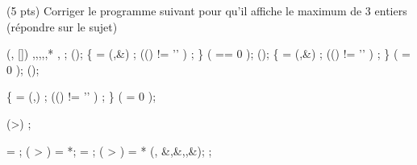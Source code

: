 
\question (5 pts) Corriger le programme suivant pour qu'il affiche le maximum
  de 3 entiers (r{\'e}pondre sur le sujet)

\begin{Ccode}
\ctab{} 
\ctab{}\cint {} (\cint {}, \cchar *[])\lb
\ctab{}  \cint {},,,,,*
,
\ctab{}  \cint {};
\ctab{}   
\ctab{}  ();
\ctab{}  \cdo \{  = (,\&) ; 
\cwhile (() != '\n' ) ; \} \cwhile (  == 0 );    
\ctab{}  ();
\ctab{}  \cdo \{  = (,\&) ; 
\cwhile (() != '\n' ) ; \} \cwhile (  = 0 );
\ctab{}  ();     
   
\ctab{}  \cdo \{  = (,) ; 
\cwhile (() != '\n' ) ; \} \cwhile (  = 0 );      
                         
\ctab{}  \cif (>) ;                                   
    
\ctab{}    \lb
\ctab{}       = ;
\ctab{}      \cif ( >  )
\ctab{}          \hspace*{2em} = *;
\ctab{}    \rb
\ctab{}  \celse
\ctab{}    \lb
\ctab{}       = ;
\ctab{}      \cif ( >  )
\ctab{}        \lb
\ctab{}           = *
\ctab{}        \rb 
\ctab{}    \rb
\ctab{}   (,
\&,\&,,\&); 
\ctab{}  ;
\ctab{}\rb
\end{Ccode}


